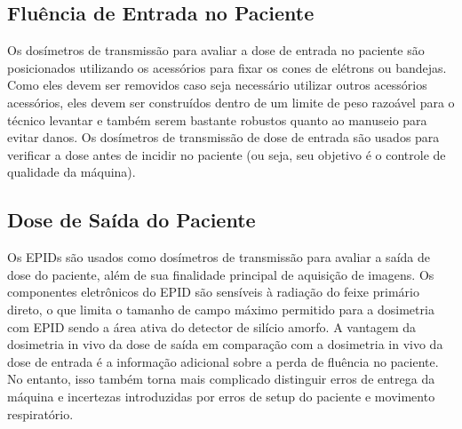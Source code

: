 \documentclass[11pt,a4paper]{article}
\begin{document}
\subsection*{Fluência de Entrada no Paciente}

	Os dosímetros de transmissão para avaliar a dose de entrada no paciente são posicionados utilizando os acessórios para fixar os cones de elétrons ou bandejas. Como eles devem ser removidos caso seja necessário utilizar outros acessórios acessórios, eles devem ser construídos dentro de um limite de peso razoável para o técnico levantar e também serem bastante robustos quanto ao manuseio para evitar danos. Os dosímetros de transmissão de dose de entrada são usados para verificar a dose antes de incidir no paciente (ou seja, seu objetivo é o controle de qualidade da máquina).

\subsection*{Dose de Saída do Paciente}

	Os EPIDs são usados como dosímetros de transmissão para avaliar a saída de dose do paciente, além de sua finalidade principal de aquisição de imagens. Os componentes eletrônicos do EPID são sensíveis à radiação do feixe primário direto, o que limita o tamanho de campo máximo permitido para a dosimetria com EPID sendo a área ativa do detector de silício amorfo. A vantagem da dosimetria in vivo da dose de saída em comparação com a dosimetria in vivo da dose de entrada é a informação adicional sobre a perda de fluência no paciente. No entanto, isso também torna mais complicado distinguir erros de entrega da máquina e incertezas introduzidas por erros de setup do paciente e movimento respiratório.



\end{document}
